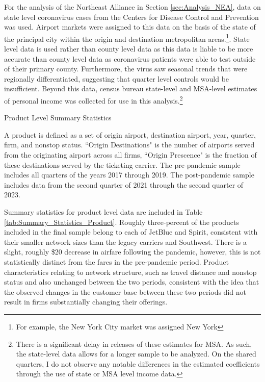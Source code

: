 \documentclass{article}
\begin{document}
	For the analysis of the Northeast Alliance in Section \ref{sec:Analysis_NEA}, data on state level coronavirus cases from the Centers for Disease Control and Prevention was used. Airport markets were assigned to this data on the basis of the state of the principal city within the origin and destination metropolitan areas.\footnote{For example, the New York City market was assigned New York}. State level data is used rather than county level data as this data is liable to be more accurate than county level data as coronavirus patients were able to test outside of their primary county. Furthermore, the virus saw seasonal trends that were regionally differentiated, suggesting that quarter level controls would be insufficient. Beyond this data, census bureau state-level and MSA-level estimates of personal income was collected for use in this analysis.\footnote{There is a significant delay in releases of these estimates for MSA. As such, the state-level data allows for a longer sample to be analyzed. On the shared quarters, I do not observe any notable differences in the estimated coefficients through the use of state or MSA level income data.}

    \begin{table}
    \caption{Product Level Summary Statistics}
    \label{tab:Summary_Statistics_Product}
                    \vspace{-15mm}
                    \begin{center}
    
    \footnotesize{A product is defined as a set of origin airport, destination airport, year, quarter, firm, and nonstop status. ``Origin Destinations" is the number of airports served from the originating airport across all firms, ``Origin Prescence" is the fraction of these destinations served by the ticketing carrier. The pre-pandemic sample includes all quarters of the years 2017 through 2019. The post-pandemic sample includes data from the second quarter of 2021 through the second quarter of 2023.}
                    \end{center}
    \end{table}

    Summary statistics for product level data are included in Table \ref{tab:Summary_Statistics_Product}. Roughly three-percent of the products included in the final sample belong to each of JetBlue and Spirit, consistent with their smaller network sizes than the legacy carriers and Southwest. There is a slight, roughly \$20 decrease in airfare following the pandemic, however, this is not statistically distinct from the fares in the pre-pandemic period. Product characteristics relating to network structure, such as travel distance and nonstop status and also unchanged between the two periods, consistent with the idea that the observed changes in the customer base between these two periods did not result in firms substantially changing their offerings.  
\end{document}

